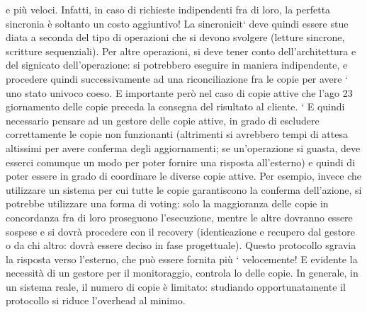 e più veloci. Infatti, in caso di richieste indipendenti fra di loro, la perfetta
sincronia è soltanto un costo aggiuntivo! La sincronicit` deve quindi essere stue
diata a seconda del tipo di operazioni che si devono svolgere (letture sincrone,
scritture sequenziali). Per altre operazioni, si deve tener conto dell'architettura
e del signicato dell'operazione: si potrebbero eseguire in maniera indipendente,
e procedere quindi successivamente ad una riconciliazione fra le copie per avere
`
uno stato univoco coeso. E importante però nel caso di copie attive che l'ago
23
giornamento delle copie preceda la consegna del risultato al cliente.
`
E quindi necessario pensare ad un gestore delle copie attive, in grado di escludere correttamente le copie non
funzionanti (altrimenti si avrebbero tempi
di attesa altissimi per avere conferma degli aggiornamenti; se un'operazione si
guasta, deve esserci comunque un modo per poter fornire una risposta all'esterno) e quindi di poter essere in grado di
coordinare le diverse copie attive. Per
esempio, invece che utilizzare un sistema per cui tutte le copie garantiscono la
conferma dell'azione, si potrebbe utilizzare una forma di voting: solo la maggioranza delle copie in concordanza fra di
loro proseguono l'esecuzione, mentre le
altre dovranno essere sospese e si dovrà procedere con il recovery (identicazione
e recupero dal gestore o da chi altro: dovrà essere deciso in fase progettuale).
Questo protocollo sgravia la risposta verso l'esterno, che può essere fornita più
`
velocemente! E evidente la necessità di un gestore per il monitoraggio, controla
lo delle copie. In generale, in un sistema reale, il numero di copie è limitato:
studiando opportunatamente il protocollo si riduce l'overhead al minimo.
